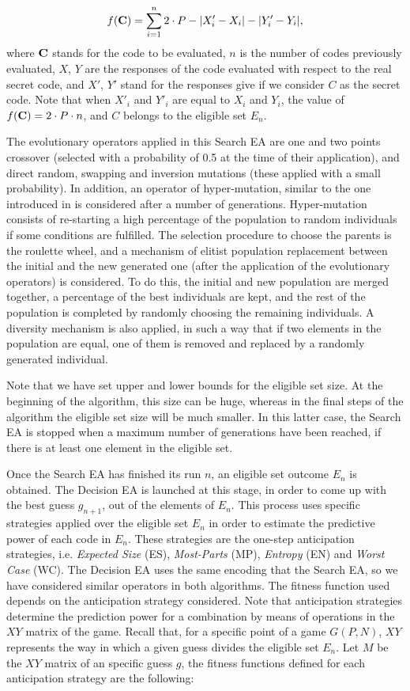 \begin{equation}
f({\bf C})=\sum_{i=1}^n 2 \cdot P-|X'_i-X_i|-|Y'_i-Y_i|,
\label{eq:dist}
\end{equation}
where ${\bf C}$ stands for the code to be evaluated, $n$ is the number of codes previously evaluated, $X$, $Y$ are the responses of the code evaluated with respect to the real secret code, and $X'$, $Y'$ stand for the responses give if we consider $C$ as the secret code. Note that when $X'_i$ and $Y'_i$ are equal to $X_i$ and $Y_i$, the value of $f({\bf C})=2 \cdot P \cdot n$, and $C$ belongs to the eligible set $E_n$.

The evolutionary operators applied in this Search EA are one and two points crossover (selected with a probability of 0.5 at the time of their application), and direct random, swapping and inversion mutations (these applied with a small probability). In addition, an operator of hyper-mutation, similar to the one introduced in \cite{Merelo06} is considered after a number of generations. Hyper-mutation consists of re-starting a high percentage of the population to random individuals if some conditions are fulfilled. The selection procedure to choose the parents is the roulette wheel, and a mechanism of elitist population replacement between the initial and the new generated one (after the application of the evolutionary operators) is considered. To do this, the initial and new population are merged together, a percentage of the best individuals are kept, and the rest of the population is completed by randomly choosing the remaining individuals. A diversity mechanism is also applied, in such a way that if two elements in the population are equal, one of them is removed and replaced by a randomly generated individual.

Note that we have set upper and lower bounds for the eligible set size. At the beginning of the algorithm, this size can be huge, whereas in the final steps of the algorithm the eligible set size will be much smaller. In this latter case, the Search EA is stopped when a maximum number of generations have been reached, if there is at least one element in the eligible set.

Once the Search EA has finished its run $n$, an eligible set outcome $E_n$ is obtained. The Decision EA is launched at this stage, in order to come up with the best guess $g_{n+1}$, out of the elements of $E_n$. This process uses specific strategies applied over the eligible set $E_n$ in order to estimate the predictive power of each code in $E_n$. These strategies are the one-step anticipation strategies, i.e. {\em Expected Size} (ES), {\em Most-Parts} (MP), {\em Entropy} (EN) and {\em Worst Case} (WC). The Decision EA uses the same encoding that the Search EA, so we have considered similar operators in both algorithms. The fitness function used depends on the anticipation strategy considered. Note that anticipation strategies determine the prediction power for a combination by means of operations in the $XY$ matrix of the game. Recall that, for a specific point of a game $G(P,N)$, $XY$ represents the way in which a given guess divides the eligible set $E_n$. Let $M$ be the $XY$ matrix of an specific guess $g$, the fitness functions defined for each anticipation strategy are the following:

